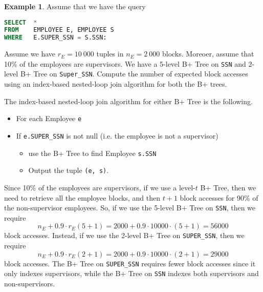 \documentclass[a4paper, openany]{memoir}
\theoremstyle{definition}
\newtheorem{example}[subsection]{Example}
\begin{document}
\begin{example}
Assume that we have the query
\begin{lstlisting}[language=SQL]
SELECT  *
FROM    EMPLOYEE E, EMPLOYEE S
WHERE   E.SUPER_SSN = S.SSN:
\end{lstlisting}
Assume we have $r_E = 10 \ 000$ tuples in $n_E = 2 \ 000$ blocks. Moreoer, assume that 10\% of the employees are supervisors. We have a 5-level B+ Tree on \texttt{SSN} and 2-level B+ Tree on \texttt{Super\_SSN}. Compute the number of expected block accesses using an index-based nested-loop join algorithm for both the B+ trees.
\end{example}
\begin{answer}
    The index-based nested-loop join algorithm for either B+ Tree is the following.
    \begin{itemize}
        \item For each Employee \texttt{e}
        \item If \texttt{e.SUPER\_SSN} is not null (i.e. the employee is not a supervisor)
        \begin{itemize}
            \item use the B+ Tree to find Employee \texttt{s.SSN}
            \item Output the tuple \texttt{(e, s)}.
        \end{itemize}
    \end{itemize}
    
    Since 10\% of the employees are supervisors, if we use a level-$t$ B+ Tree, then we need to retrieve all the employee blocks, and then $t+1$ block accesses for 90\% of the non-supervisor employees. So, if we use the 5-level B+ Tree on \texttt{SSN}, then we require
    \[n_E + 0.9 \cdot r_E (5 + 1) = 2000 + 0.9 \cdot 10000 \cdot (5 + 1) = 56 000\]
    block accesses. Instead, if we use the 2-level B+ Tree on \texttt{SUPER\_SSN}, then we require
    \[n_E + 0.9 \cdot r_E (2 + 1) = 2000 + 0.9 \cdot 10000 \cdot (2 + 1) = 29 000\]
    block accesses. The B+ Tree on \texttt{SUPER\_SSN} requires fewer block accesses since it only indexes supervisors, while the B+ Tree on \texttt{SSN} indexes both supervisors and non-supervisors.        
\end{answer}
\newpage
\end{document}
